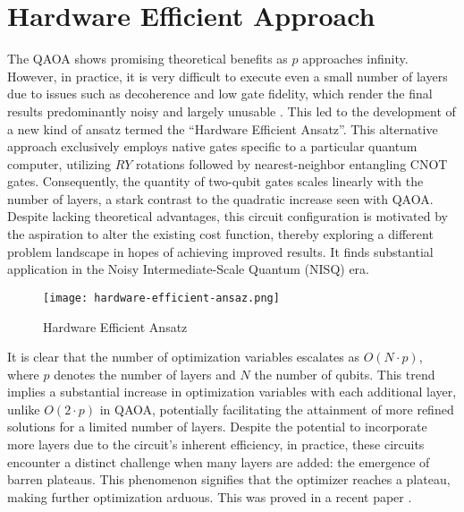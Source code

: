 \documentclass[12pt,a4paper]{report}
\begin{document}
\section{Hardware Efficient Approach}

\noindent
The QAOA shows promising theoretical benefits as \( p \) approaches infinity. However, in practice, it is very difficult to execute even a small number of layers due to issues such as decoherence and low gate fidelity, which render the final results predominantly noisy and largely unusable \cite{qaoa_google_sc_device}. This led to the development of a new kind of ansatz termed the ``Hardware Efficient Ansatz''. This alternative approach exclusively employs native gates specific to a particular quantum computer, utilizing \( RY \) rotations followed by nearest-neighbor entangling CNOT gates. Consequently, the quantity of two-qubit gates scales linearly with the number of layers, a stark contrast to the quadratic increase seen with QAOA. 
\\

\noindent
Despite lacking theoretical advantages, this circuit configuration is motivated by the aspiration to alter the existing cost function, thereby exploring a different problem landscape in hopes of achieving improved results. It finds substantial application in the Noisy Intermediate-Scale Quantum (NISQ) era.

\begin{figure}[h]
    \centering
    \texttt{[image: hardware-efficient-ansaz.png]}
    \caption{Hardware Efficient Ansatz}
    \label{fig:hardware_efficient_circuit}
\end{figure}

\noindent
It is clear that the number of optimization variables escalates as \(O(N \cdot p)\), where \(p\) denotes the number of layers and \(N\) the number of qubits. This trend implies a substantial increase in optimization variables with each additional layer, unlike \(O(2 \cdot p)\) in QAOA, potentially facilitating the attainment of more refined solutions for a limited number of layers. Despite the potential to incorporate more layers due to the circuit's inherent efficiency, in practice, these circuits encounter a distinct challenge when many layers are added: the emergence of barren plateaus. This phenomenon signifies that the optimizer reaches a plateau, making further optimization arduous. This was proved in a recent paper \cite{barren_plataeu}.
\end{document}

